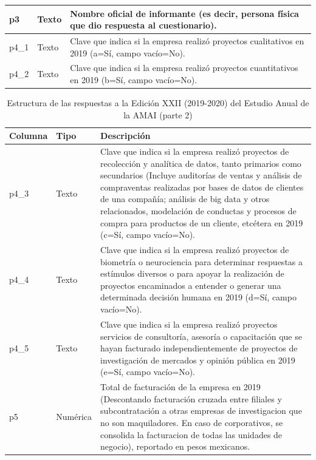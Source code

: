 \begin{table}[]
\begin{tabular}{|l|l|l|}
p3               & Texto & \parbox[t]{8cm}{Nombre oficial de informante (es decir, persona física que dio respuesta al cuestionario). \vspace{0.1cm}}              \\ \hline
p4\_1            & Texto & \parbox[t]{8cm}{Clave que indica si la empresa realizó proyectos cualitativos en 2019 (a=Sí,  campo vacío=No). \vspace{0.1cm}}  \\ \hline
p4\_2            & Texto & \parbox[t]{8cm}{Clave que indica si la empresa realizó proyectos cuantitativos en 2019 (b=Sí,  campo vacío=No). \vspace{0.1cm}} \\ \hline
\end{tabular}
\end{table}



\begin{table}[]
\caption{Estructura de las respuestas a la Edición XXII (2019-2020) del Estudio Anual de la AMAI (parte 2)}
\label{tab:raw2019_2}
\begin{tabular}{|l|l|l|}
\hline
Columna &
  Tipo &
  Descripción \\ \hline
p4\_3 &
  Texto &
  \parbox[t]{9cm}{Clave que indica si la empresa realizó proyectos  de recolección y analítica de datos, tanto primarios como secundarios (Incluye auditorías de ventas y análisis de compraventas realizadas por bases de datos de clientes de una compañía; análisis de big data y otros relacionados, modelación de conductas y procesos de compra para productos de un cliente, etcétera en 2019 (c=Sí,  campo vacío=No).} \\ \hline
p4\_4 &
  Texto &
  \parbox[t]{9cm}{Clave que indica si la empresa realizó proyectos de biometría o neurociencia para determinar respuestas a estímulos diversos o para apoyar la realización de proyectos encaminados a entender o generar una determinada decisión humana en 2019 (d=Sí,  campo vacío=No).} \\ \hline
p4\_5 &
  Texto &
  \parbox[t]{9cm}{Clave que indica si la empresa realizó proyectos servicios de consultoría, asesoría o capacitación que se hayan facturado independientemente de proyectos de investigación de mercados y opinión pública en 2019 (e=Sí,  campo vacío=No).} \\ \hline
p5 &
  Numérica &
  \parbox[t]{9cm}{Total de facturación de la empresa en 2019 (Descontando facturación cruzada entre filiales y subcontratación a otras empresas de investigacion que no son maquiladores. En caso de corporativos, se consolida la facturacion de todas las unidades de negocio), reportado en pesos mexicanos.} \\ \hline
\end{tabular}
\end{table}


